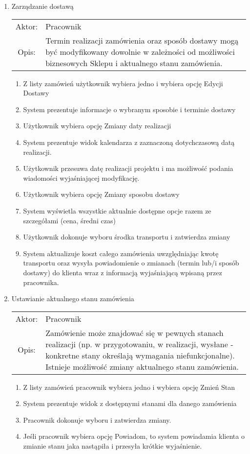 \begin{enumerate}
  \item Zarządzanie dostawą\\
  \begin{tabularx}{\linewidth}{c X}
  Aktor: & Pracownik \\
  Opis: & Termin realizacji zamówienia oraz sposób dostawy mogą być
  modyfikowany dowolnie w zależności od możliwości biznesowych Sklepu i
  aktualnego stanu zamówienia.
  \end{tabularx}
	\begin{enumerate}
	  \item Z listy zamówień użytkownik wybiera jedno i wybiera opcję Edycji
	  Dostawy
	  \item System prezentuje informacje o wybranym sposobie i terminie dostawy
	  \item Użytkownik wybiera opcję Zmiany daty realizacji
	  \item System prezentuje widok kalendarza z zaznaczoną dotychczasową datą
	  realizacji.
	  \item Użytkownik przesuwa datę realizacji projektu i ma możliwość podania
	  wiadomości wyjaśniającej modyfikację.
	  \item Użytkownik wybiera opcję Zmiany sposobu dostawy
	  \item System wyświetla wszystkie aktualnie dostępne opcje razem ze
	  szczegółami (cena, średni czas)
	  \item Użytkownik dokonuje wyboru środka transportu i zatwierdza zmiany
	  \item System aktualizuje koszt całego zamówienia uwzględniając kwotę
	  transportu oraz wysyła powiadomienie o zmianach (termin lub/i sposób dostawy)
	  do klienta wraz z informacją wyjaśniającą wpisaną przez pracownika.
	\end{enumerate}

  \item Ustawianie aktualnego stanu zamówienia\\
  \begin{tabularx}{\linewidth}{c X}
  Aktor: & Pracownik \\
  Opis: & Zamówienie może znajdować się w pewnych stanach realizacji (np. w
  przygotowaniu, w realizacji, wysłane - konkretne stany określają wymagania
  niefunkcjonalne). Istnieje możliwość zmiany aktualnego stanu zamówienia.
  \end{tabularx}
	\begin{enumerate}
	  \item Z listy zamówień pracownik wybiera jedno i wybiera opcję Zmień Stan
	  \item System prezentuje widok z dostępnymi stanami dla danego zamówienia
	  \item Pracownik dokonuje wyboru i zatwierdza zmiany.
	  \item Jeśli pracownik wybiera opcję Powiadom, to system powiadamia klienta o
	  zmianie stanu jaka nastąpiła i przesyła krótkie wyjaśnienie.
	\end{enumerate}
	 
\end{enumerate}
